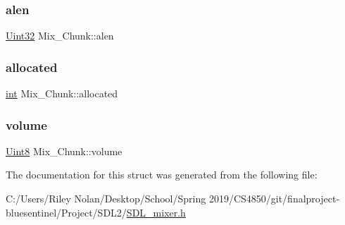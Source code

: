 \subsubsection{\texorpdfstring{alen}{alen}}
{\footnotesize\ttfamily \mbox{\hyperlink{_s_d_l__stdinc_8h_add440eff171ea5f55cb00c4a9ab8672d}{Uint32}} Mix\+\_\+\+Chunk\+::alen}

\mbox{\label{struct_mix___chunk_a7b985b90b5f97fffe34834116a281615}} 
\subsubsection{\texorpdfstring{allocated}{allocated}}
{\footnotesize\ttfamily \mbox{\hyperlink{warnings_8h_a74f207b5aa4ba51c3a2ad59b219a423b}{int}} Mix\+\_\+\+Chunk\+::allocated}

\mbox{\label{struct_mix___chunk_afc566fd5da7f0ed1f3577f5bc0eac319}} 
\subsubsection{\texorpdfstring{volume}{volume}}
{\footnotesize\ttfamily \mbox{\hyperlink{_s_d_l__stdinc_8h_a2944638813a090aa23e62f4da842c3e2}{Uint8}} Mix\+\_\+\+Chunk\+::volume}



The documentation for this struct was generated from the following file\+:\begin{DoxyCompactItemize}
\item 
C\+:/\+Users/\+Riley Nolan/\+Desktop/\+School/\+Spring 2019/\+C\+S4850/git/finalproject-\/bluesentinel/\+Project/\+S\+D\+L2/\mbox{\hyperlink{_s_d_l__mixer_8h}{S\+D\+L\+\_\+mixer.\+h}}\end{DoxyCompactItemize}
